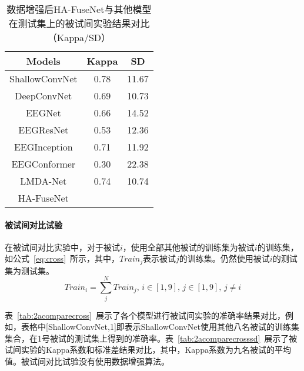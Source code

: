 \begin{table}[ht]
    \centering
    \caption{数据增强后HA-FuseNet与其他模型在测试集上的被试间实验结果对比（Kappa/SD）}
    \label{tab:2acompareagsd}
    \begin{tabularx}{\textwidth}{CCC}
      \toprule
      Models & Kappa & SD \\
      \midrule
      ShallowConvNet\cite{schirrmeister2017deep} & 0.78 & 11.67 \\
      DeepConvNet\cite{schirrmeister2017deep} & 0.69 & 10.73 \\
      EEGNet\cite{lawhern2018eegnet} & 0.66 & 14.52 \\
      EEGResNet\cite{HBM:HBM23730} & 0.53 & 12.36 \\
      EEGInception\cite{zhang2021eeg} & 0.71 & 11.92 \\
      EEGConformer\cite{song2022eeg} & 0.30 & 22.38 \\
      LMDA-Net\cite{miao2023lmda} & 0.74 & 10.74 \\
      \midrule 
      HA-FuseNet \\
      \bottomrule
    \end{tabularx}
\end{table}

\paragraph{被试间对比试验}

在被试间对比实验中，对于被试\(i\)，使用全部其他被试的训练集为被试\(i\)的训练集，如公式~\ref{eq:cross}~所示，其中，\(Train_j\)表示被试\(j\)的训练集。仍然使用被试\(i\)的测试集为测试集。
\begin{equation}
    \label{eq:cross}
    Train_i=\sum_{j}^{N}Train_j,\,i \in [1,9],\,j \in [1,9],\,j \neq i
\end{equation}

表~\ref{tab:2acomparecross}~展示了各个模型进行被试间实验的准确率结果对比，例如，表格中[ShallowConvNet,1]即表示ShallowConvNet使用其他八名被试的训练集集合，在1号被试的测试集上得到的准确率。表~\ref{tab:2acomparecrosssd}~展示了被试间实验的Kappa系数和标准差结果对比，其中，Kappa系数为九名被试的平均值。被试间对比试验没有使用数据增强算法。

